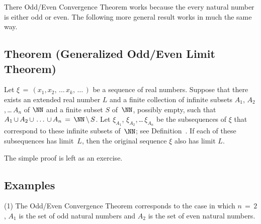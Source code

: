 \VV

        There Odd/Even Convergence Theorem works because the every natural number is either odd or even.
    The following more general result works in much the same way.

\V

            \subsection{\small{\bf Theorem} (Generalized Odd/Even Limit Theorem)}
            \label{ThmC20.90A}

\V

        Let ${\xi} \,=\, (x_{1}, x_{2},\,{\ldots}\,x_{k},\,{\ldots}\,)$ be a sequence of real numbers.
    Suppose that there exists an extended real number $L$ and a finite collection of infinite subsets $A_{1}$, $A_{2}$,\,{\ldots}\,$A_{n}$ of ${\NN}$ 
    and a finite subset $S$ of~${\NN}$, possibly empty, such that $A_{1}\,{\cup}\,A_{2}\,{\cup}\,\,{\ldots}\,\,{\cup}\,A_{n} \,=\,
    {\NN}\,{\setminus}\,S$. Let ${\xi}_{A_{1}}$, ${\xi}_{A_{2}}$,\,{\ldots}\,${\xi}_{A_{n}}$
    be the subsequences of ${\xi}$ that correspond to these infinite subsets of~${\NN}$; 
    see Definition~. If each of these subsequences has limit~$L$, then the original sequence ${\xi}$ also has limit $L$.

\V

        The simple proof is left as an exercise. %

\V

        \subsection{\small{{\bf Examples}}}
        \label{ExampC20.95A}

\V

\hspace*{\parindent}(1) The Odd/Even Convergence Theorem corresponds to the case in which $n \,=\, 2$,
    $A_{1}$ is the set of odd natural numbers and $A_{2}$ is the set of even natural numbers.

\V

